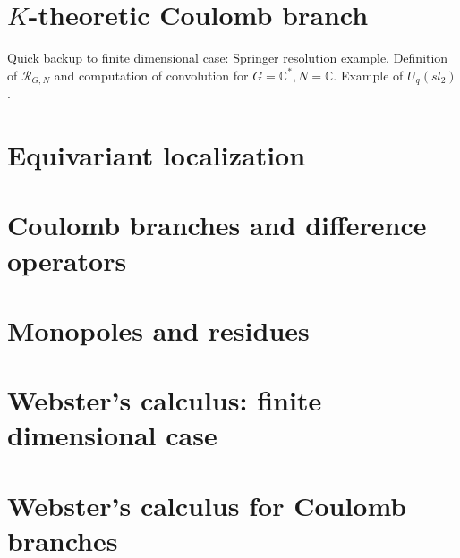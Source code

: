 \documentclass[11pt]{amsart}
\theoremstyle{definition}
\newcommand{\bC}{\mathbb{C}}
\newcommand{\Rc}{{\mathcal{R}}}
\numberwithin{equation}{subsection}
\numberwithin{figure}{subsection}
\begin{document}
\section{$K$-theoretic Coulomb branch}
Quick backup to finite dimensional case: Springer resolution example. Definition of $\Rc_{G,N}$ and computation of convolution for $G=\bC^*,N=\bC$. Example of $U_q(sl_2)$.

\section{Equivariant localization}

\section{Coulomb branches and difference operators}

\section{Monopoles and residues}

\section{Webster's calculus: finite dimensional case}

\section{Webster's calculus for Coulomb branches}


 
\end{document}
